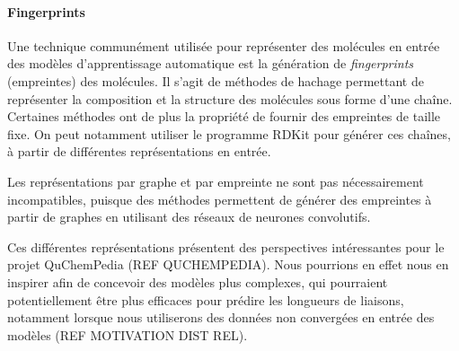 \paragraph{Fingerprints} Une technique communément utilisée pour représenter des molécules en entrée des modèles d'apprentissage automatique est la génération de \emph{fingerprints} (empreintes) des molécules. Il s'agit de méthodes de hachage permettant de représenter la composition et la structure des molécules sous forme d'une chaîne. Certaines méthodes ont de plus la propriété de fournir des empreintes de taille fixe. On peut notamment utiliser le programme RDKit\cite{rdkit} pour générer ces chaînes, à partir de différentes représentations en entrée.
\par Les représentations par graphe et par empreinte ne sont pas nécessairement incompatibles, puisque des méthodes permettent de générer des empreintes à partir de graphes en utilisant des réseaux de neurones convolutifs\cite{graph_fingerprint}.\\

\par Ces différentes représentations présentent des perspectives intéressantes pour le projet QuChemPedia (REF QUCHEMPEDIA). Nous pourrions en effet nous en inspirer afin de concevoir des modèles plus complexes, qui pourraient potentiellement être plus efficaces pour prédire les longueurs de liaisons, notamment lorsque nous utiliserons des données non convergées en entrée des modèles (REF MOTIVATION DIST REL).





